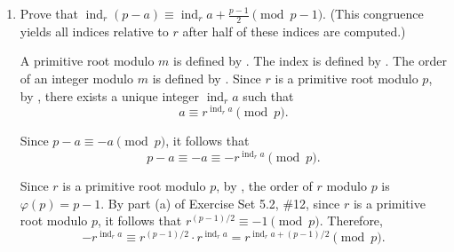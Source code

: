 \begin{enumerate}
\begin{enumerate}
\begin{subprove}
      Since $s$ is a primitive root modulo $p$, it follows that $\gcd(\operatorname{ind}_r s, p-1) = 1$ (because if $\gcd(\operatorname{ind}_r s, p-1) = d > 1$, then the order of $s$ modulo $p$ would divide $(p-1)/d < p-1$, contradicting that $s$ is a primitive root).
      Therefore, $\operatorname{ind}_r s$ has a multiplicative inverse modulo $p-1$.
      Multiplying both sides of the congruence by $(\operatorname{ind}_r s)^{-1} \pmod{p-1}$, it follows that
      \[
      \operatorname{ind}_s a \equiv \operatorname{ind}_r a \cdot (\operatorname{ind}_r s)^{-1} \pmod{p-1}.
      \]
      
      However, since $r \equiv s^{\operatorname{ind}_s r} \pmod{p}$ and $s \equiv r^{\operatorname{ind}_r s} \pmod{p}$, by the same argument it follows that $\operatorname{ind}_r s \cdot \operatorname{ind}_s r \equiv 1 \pmod{p-1}$.
      Therefore, $(\operatorname{ind}_r s)^{-1} \equiv \operatorname{ind}_s r \pmod{p-1}$.
      
      Substituting, it follows that
      \[
      \operatorname{ind}_s a \equiv \operatorname{ind}_r a \cdot \operatorname{ind}_s r \pmod{p-1}.
      \]
      Therefore, $\operatorname{ind}_s a \equiv (\operatorname{ind}_r a)(\operatorname{ind}_s r) \pmod{p-1}$.
    \end{subprove}
    
    \item Prove that $\operatorname{ind}_r(p-a) \equiv \operatorname{ind}_r a + \frac{p-1}{2} \pmod{p-1}$. 
    (This congruence yields all indices relative to $r$ after half of these indices are computed.)
    \begin{subprove}
      A primitive root modulo $m$ is defined by .
      The index is defined by .
      The order of an integer modulo $m$ is defined by .
      Since $r$ is a primitive root modulo $p$, by , there exists a unique integer $\operatorname{ind}_r a$ such that
      \[
      a \equiv r^{\operatorname{ind}_r a} \pmod{p}.
      \]
      
      Since $p-a \equiv -a \pmod{p}$, it follows that
      \[
      p-a \equiv -a \equiv -r^{\operatorname{ind}_r a} \pmod{p}.
      \]
      
      Since $r$ is a primitive root modulo $p$, by , the order of $r$ modulo $p$ is $\varphi(p) = p-1$.
      By part (a) of Exercise Set 5.2, \#12, since $r$ is a primitive root modulo $p$, it follows that $r^{(p-1)/2} \equiv -1 \pmod{p}$.
      Therefore,
      \[
      -r^{\operatorname{ind}_r a} \equiv r^{(p-1)/2} \cdot r^{\operatorname{ind}_r a} = r^{\operatorname{ind}_r a + (p-1)/2} \pmod{p}.
      \]
      

\end{subprove}
\end{enumerate}
\end{enumerate}
